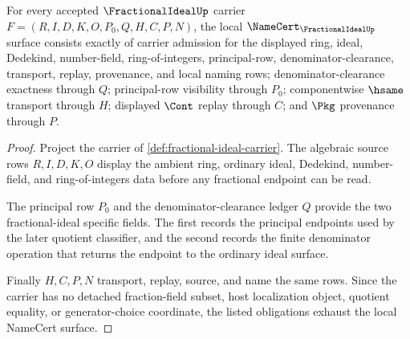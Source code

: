 \begin{theorem}\label{thm:fractional-ideal-namecert-obligations}
For every accepted $\FractionalIdealUp$ carrier $F=(R,I,D,K,O,P_0,Q,H,C,P,N)$, the local $\NameCert_{\FractionalIdealUp}$ surface consists exactly of carrier admission for the displayed ring, ideal, Dedekind, number-field, ring-of-integers, principal-row, denominator-clearance, transport, replay, provenance, and local naming rows; denominator-clearance exactness through $Q$; principal-row visibility through $P_0$; componentwise $\hsame$ transport through $H$; displayed $\Cont$ replay through $C$; and $\Pkg$ provenance through $P$.
\end{theorem}
\begin{proof}
Project the carrier of \autoref{def:fractional-ideal-carrier}. The algebraic source rows $R,I,D,K,O$ display the ambient ring, ordinary ideal, Dedekind, number-field, and ring-of-integers data before any fractional endpoint can be read.

The principal row $P_0$ and the denominator-clearance ledger $Q$ provide the two fractional-ideal specific fields. The first records the principal endpoints used by the later quotient classifier, and the second records the finite denominator operation that returns the endpoint to the ordinary ideal surface.

Finally $H,C,P,N$ transport, replay, source, and name the same rows. Since the carrier has no detached fraction-field subset, host localization object, quotient equality, or generator-choice coordinate, the listed obligations exhaust the local NameCert surface.
\end{proof}

